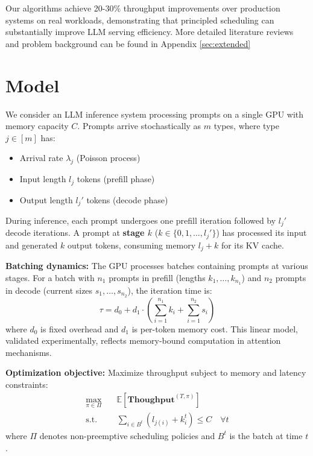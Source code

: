\documentclass[preprint]{article}
\newcommand{\throughput}{\textbf{Thoughput}}
\theoremstyle{plain}
\theoremstyle{definition}
\theoremstyle{remark}
\begin{document}
Our algorithms achieve 20-30\% throughput improvements over production systems on real workloads, demonstrating that principled scheduling can substantially improve LLM serving efficiency. More detailed literature reviews and problem background can be found in Appendix \ref{sec:extended}

\section{Model}

We consider an LLM inference system processing prompts on a single GPU with memory capacity $C$. Prompts arrive stochastically as $m$ types, where type $j \in [m]$ has:
\begin{itemize}[leftmargin=*,topsep=0pt,itemsep=0pt]
\item Arrival rate $\lambda_j$ (Poisson process)
\item Input length $l_j$ tokens (prefill phase)
\item Output length $l_j'$ tokens (decode phase)
\end{itemize}

During inference, each prompt undergoes one prefill iteration followed by $l_j'$ decode iterations. A prompt at \textbf{stage $k$} ($k \in \{0,1,\ldots,l_j'\}$) has processed its input and generated $k$ output tokens, consuming memory $l_j + k$ for its KV cache.

\textbf{Batching dynamics:} The GPU processes batches containing prompts at various stages. For a batch with $n_1$ prompts in prefill (lengths $k_1,\ldots,k_{n_1}$) and $n_2$ prompts in decode (current sizes $s_1,\ldots,s_{n_2}$), the iteration time is:
\begin{equation}
\tau = d_0 + d_1 \cdot \left( \sum_{i=1}^{n_1} k_i + \sum_{i=1}^{n_2} s_i \right)
\end{equation}
where $d_0$ is fixed overhead and $d_1$ is per-token memory cost. This linear model, validated experimentally, reflects memory-bound computation in attention mechanisms.

\textbf{Optimization objective:} Maximize throughput subject to memory and latency constraints:
\begin{align}
\max_{\pi \in \Pi} \quad &\mathbb{E}[\throughput^{(T,\pi)}] \\
\text{s.t.}\quad & \sum_{i \in B^t} (l_{j(i)} + k_i^t) \le C \quad \forall t \nonumber
\end{align}
where $\Pi$ denotes non-preemptive scheduling policies and $B^t$ is the batch at time $t$.
\end{document}
